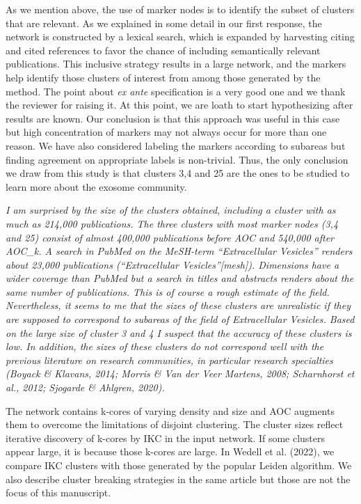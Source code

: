 \documentclass[11pt, oneside]{article}   	%
\begin{document}
\vspace{2 mm}  
As we mention above, the use of marker nodes is to identify the subset of clusters that are relevant. As we explained in some detail in our first response, the network is constructed by a lexical search, which is expanded by harvesting citing and cited references to favor the chance of including semantically relevant publications. This inclusive strategy results in a large network, and the markers help identify those clusters of interest from among those generated by the method. The point about \emph{ex ante} specification is a very good one and we thank the reviewer for raising it. At this point, we are loath to start hypothesizing after results are known. Our conclusion is that this approach was useful in this case but high concentration of markers may not always occur for more than one reason. We have also considered labeling the markers according to subareas but finding agreement on appropriate labels is non-trivial. Thus, the only conclusion we draw from this study is that clusters 3,4 and 25 are the ones to be studied to learn more about the exosome community. 

\vspace{2 mm}  
\emph{ I am surprised by the size of the clusters obtained, including a cluster with as much as 214,000 publications. The three clusters with most marker nodes (3,4 and 25) consist of almost 400,000 publications before AOC and 540,000 after AOC\_k. A search in PubMed on the MeSH-term “Extracellular Vesicles” renders about 23,000 publications (“Extracellular Vesicles”[mesh]). Dimensions have a wider coverage than PubMed but a search in titles and abstracts renders about the same number of publications. This is of course a rough estimate of the field. Nevertheless, it seems to me that the sizes of these clusters are unrealistic if they are supposed to correspond to subareas of the field of Extracellular Vesicles. Based on the large size of cluster 3 and 4 I suspect that the accuracy of these clusters is low. In addition, the sizes of these clusters do not correspond well with the previous literature on research communities, in particular research specialties (Boyack \& Klavans, 2014; Morris \& Van der Veer Martens, 2008; Scharnhorst et al., 2012; Sjogarde \& Ahlgren, 2020).}

\vspace{2 mm} 
The network contains k-cores of varying density and size and AOC augments them to overcome the limitations of disjoint clustering. The cluster sizes reflect iterative discovery of k-cores by IKC in the input network. If some clusters appear large, it is because those k-cores are large. In Wedell et al. (2022), we compare IKC clusters with those generated by the popular Leiden algorithm. We also describe cluster breaking strategies in the same article but those are not the focus of this manuscript.
\end{document}
